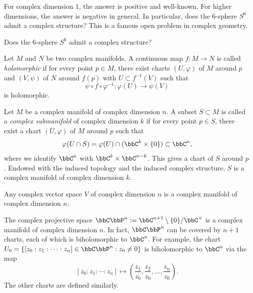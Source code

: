 For complex dimension \(1\), the answer is positive and well-known.
For higher dimensions, the answer is negative in general.
In particular, does the \(6\)-sphere \(S^6\) admit a complex structure?
This is a famous open problem in complex geometry.

\begin{question}\label{qs:complex_structure_on_S6}
	Does the \(6\)-sphere \(S^6\) admit a complex structure?
\end{question}

\begin{definition}\label{def:holomorphic_map_between_complex_manifolds}
	Let \(M\) and \(N\) be two complex manifolds.
	A continuous map \(f: M\to N\) is called \emph{holomorphic} if for every point \(p\in M\), there exist charts \((U,\varphi)\) of \(M\) around \(p\) and \((V,\psi)\) of \(N\) around \(f(p)\) with \(U \subset f^{-1}(V)\) such that
	\[
		\psi\circ f\circ \varphi^{-1}: \varphi(U)\to \psi(V)
	\]
	is holomorphic.
\end{definition}

\begin{definition}\label{def:submanifold_of_complex_manifold}
	Let \(M\) be a complex manifold of complex dimension \(n\).
	A subset \(S\subset M\) is called a \emph{complex submanifold} of complex dimension \(k\) if for every point \(p\in S\), there exist a chart \((U,\varphi)\) of \(M\) around \(p\) such that
	\[
		\varphi(U\cap S) = \varphi(U)\cap (\bbC^k\times \{0\}) \subset \bbC^n,
	\]
	where we identify \(\bbC^n\) with \(\bbC^k\times \bbC^{n-k}\).
	This gives a chart of \(S\) around \(p\).
	Endowed with the induced topology and the induced complex structure, \(S\) is a complex manifold of complex dimension \(k\).
\end{definition}

\begin{example}\label{eg:complex_vector_space_as_complex_manifold}
	Any complex vector space \(V\) of complex dimension \(n\) is a complex manifold of complex dimension \(n\).
\end{example}

\begin{example}\label{eg:complex_projective_space_as_complex_manifold}
	The complex projective space \(\bbC\bbP^n:= \bbC^{n+1}\setminus \{0\}/\bbC^\times\) is a complex manifold of complex dimension \(n\).
	In fact, \(\bbC\bbP^n\) can be covered by \(n+1\) charts, each of which is biholomorphic to \(\bbC^n\).
	For example, the chart \(U_0 = \{[z_0: z_1: \cdots: z_n]\in \bbC\bbP^n: z_0\neq 0\}\) is biholomorphic to \(\bbC^n\) via the map
	\[
		[z_0: z_1: \cdots: z_n] \mapsto \left(\frac{z_1}{z_0}, \frac{z_2}{z_0}, \ldots, \frac{z_n}{z_0}\right).
	\]
	The other charts are defined similarly.
\end{example}

